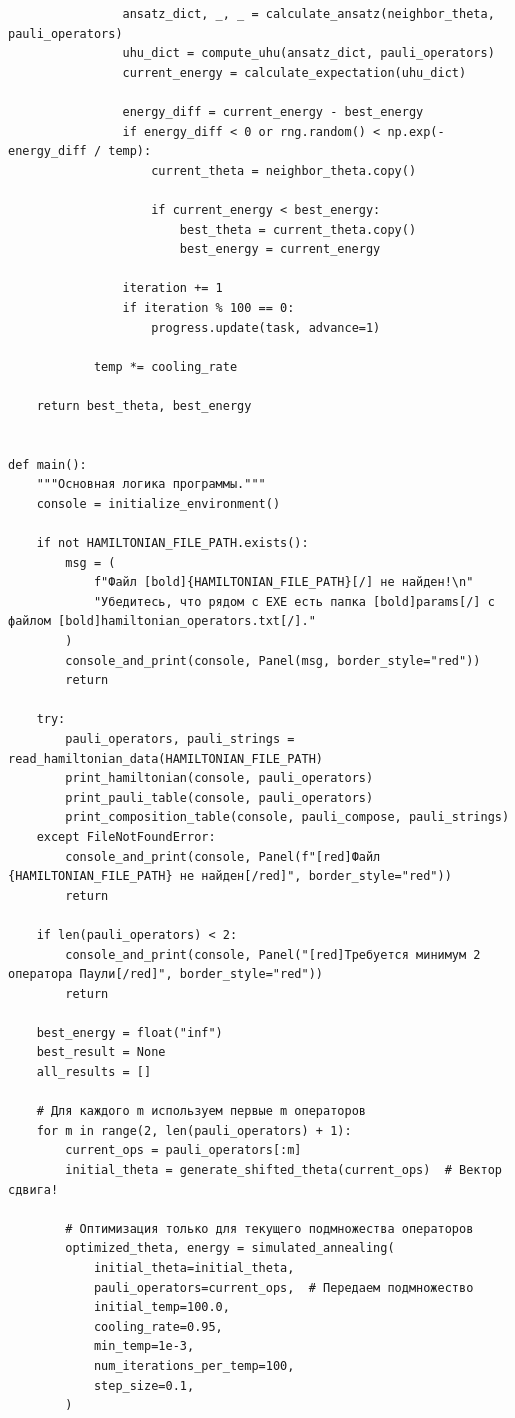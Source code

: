\documentclass[a4paper]{report}
\begin{document}
\begin{lstlisting}
                ansatz_dict, _, _ = calculate_ansatz(neighbor_theta, pauli_operators)
                uhu_dict = compute_uhu(ansatz_dict, pauli_operators)
                current_energy = calculate_expectation(uhu_dict)

                energy_diff = current_energy - best_energy
                if energy_diff < 0 or rng.random() < np.exp(-energy_diff / temp):
                    current_theta = neighbor_theta.copy()

                    if current_energy < best_energy:
                        best_theta = current_theta.copy()
                        best_energy = current_energy

                iteration += 1
                if iteration % 100 == 0:
                    progress.update(task, advance=1)

            temp *= cooling_rate

    return best_theta, best_energy


def main():
    """Основная логика программы."""
    console = initialize_environment()

    if not HAMILTONIAN_FILE_PATH.exists():
        msg = (
            f"Файл [bold]{HAMILTONIAN_FILE_PATH}[/] не найден!\n"
            "Убедитесь, что рядом с EXE есть папка [bold]params[/] с файлом [bold]hamiltonian_operators.txt[/]."
        )
        console_and_print(console, Panel(msg, border_style="red"))
        return

    try:
        pauli_operators, pauli_strings = read_hamiltonian_data(HAMILTONIAN_FILE_PATH)
        print_hamiltonian(console, pauli_operators)
        print_pauli_table(console, pauli_operators)
        print_composition_table(console, pauli_compose, pauli_strings)
    except FileNotFoundError:
        console_and_print(console, Panel(f"[red]Файл {HAMILTONIAN_FILE_PATH} не найден[/red]", border_style="red"))
        return

    if len(pauli_operators) < 2:
        console_and_print(console, Panel("[red]Требуется минимум 2 оператора Паули[/red]", border_style="red"))
        return

    best_energy = float("inf")
    best_result = None
    all_results = []

    # Для каждого m используем первые m операторов
    for m in range(2, len(pauli_operators) + 1):
        current_ops = pauli_operators[:m]
        initial_theta = generate_shifted_theta(current_ops)  # Вектор сдвига!

        # Оптимизация только для текущего подмножества операторов
        optimized_theta, energy = simulated_annealing(
            initial_theta=initial_theta,
            pauli_operators=current_ops,  # Передаем подмножество
            initial_temp=100.0,
            cooling_rate=0.95,
            min_temp=1e-3,
            num_iterations_per_temp=100,
            step_size=0.1,
        )


\end{lstlisting}
\end{document}
